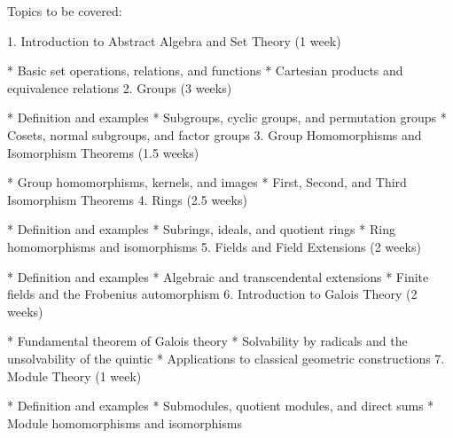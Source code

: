 
Topics to be covered:

1.  Introduction to Abstract Algebra and Set Theory (1 week)
    
    *   Basic set operations, relations, and functions
    *   Cartesian products and equivalence relations
2.  Groups (3 weeks)
    
    *   Definition and examples
    *   Subgroups, cyclic groups, and permutation groups
    *   Cosets, normal subgroups, and factor groups
3.  Group Homomorphisms and Isomorphism Theorems (1.5 weeks)
    
    *   Group homomorphisms, kernels, and images
    *   First, Second, and Third Isomorphism Theorems
4.  Rings (2.5 weeks)
    
    *   Definition and examples
    *   Subrings, ideals, and quotient rings
    *   Ring homomorphisms and isomorphisms
5.  Fields and Field Extensions (2 weeks)
    
    *   Definition and examples
    *   Algebraic and transcendental extensions
    *   Finite fields and the Frobenius automorphism
6.  Introduction to Galois Theory (2 weeks)
    
    *   Fundamental theorem of Galois theory
    *   Solvability by radicals and the unsolvability of the quintic
    *   Applications to classical geometric constructions
7.  Module Theory (1 week)
    
    *   Definition and examples
    *   Submodules, quotient modules, and direct sums
    *   Module homomorphisms and isomorphisms

